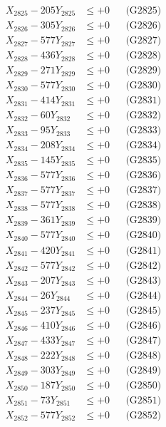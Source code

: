 \documentclass[a4paper,10pt]{article}
\begin{document}
{\begin{align}
X_{2825} - 205Y_{2825} &\leq +0 && \text{(G2825)} \\
X_{2826} - 305Y_{2826} &\leq +0 && \text{(G2826)} \\
X_{2827} - 577Y_{2827} &\leq +0 && \text{(G2827)} \\
X_{2828} - 436Y_{2828} &\leq +0 && \text{(G2828)} \\
X_{2829} - 271Y_{2829} &\leq +0 && \text{(G2829)} \\
X_{2830} - 577Y_{2830} &\leq +0 && \text{(G2830)} \\
\allowbreak
X_{2831} - 414Y_{2831} &\leq +0 && \text{(G2831)} \\
X_{2832} - 60Y_{2832} &\leq +0 && \text{(G2832)} \\
X_{2833} - 95Y_{2833} &\leq +0 && \text{(G2833)} \\
X_{2834} - 208Y_{2834} &\leq +0 && \text{(G2834)} \\
X_{2835} - 145Y_{2835} &\leq +0 && \text{(G2835)} \\
X_{2836} - 577Y_{2836} &\leq +0 && \text{(G2836)} \\
X_{2837} - 577Y_{2837} &\leq +0 && \text{(G2837)} \\
X_{2838} - 577Y_{2838} &\leq +0 && \text{(G2838)} \\
X_{2839} - 361Y_{2839} &\leq +0 && \text{(G2839)} \\
X_{2840} - 577Y_{2840} &\leq +0 && \text{(G2840)} \\
\allowbreak
X_{2841} - 420Y_{2841} &\leq +0 && \text{(G2841)} \\
X_{2842} - 577Y_{2842} &\leq +0 && \text{(G2842)} \\
X_{2843} - 207Y_{2843} &\leq +0 && \text{(G2843)} \\
X_{2844} - 26Y_{2844} &\leq +0 && \text{(G2844)} \\
X_{2845} - 237Y_{2845} &\leq +0 && \text{(G2845)} \\
X_{2846} - 410Y_{2846} &\leq +0 && \text{(G2846)} \\
X_{2847} - 433Y_{2847} &\leq +0 && \text{(G2847)} \\
X_{2848} - 222Y_{2848} &\leq +0 && \text{(G2848)} \\
X_{2849} - 303Y_{2849} &\leq +0 && \text{(G2849)} \\
X_{2850} - 187Y_{2850} &\leq +0 && \text{(G2850)} \\
\allowbreak
X_{2851} - 73Y_{2851} &\leq +0 && \text{(G2851)} \\
X_{2852} - 577Y_{2852} &\leq +0 && \text{(G2852)} \\

\end{align}}
\end{document}
